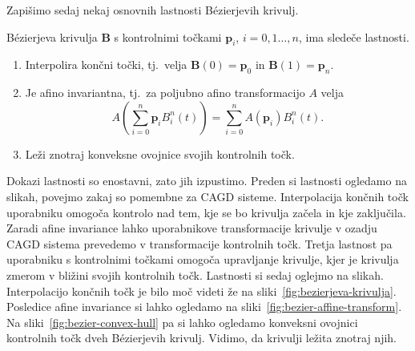 \documentclass[isrm2, tisk]{fmfdelo}
\newcommand{\p}{\mathbf{p}}
\newcommand{\lilb}[2]{B_{#1}^{#2}(t)}
\newcommand{\bernsteinsump}[2]{\sum_{#1=0}^{#2} \p_{#1}\lilb{#1}{#2}}
\newcommand{\bernsteinsumtritri}[3]{\sum_{#1=0}^{#2} #3\lilb{#1}{#2}}
\begin{document}
    Zapišimo sedaj nekaj osnovnih lastnosti Bézierjevih krivulj.
    \begin{izrek}{Bézierjeva krivulja $\mathbf{B}$ s kontrolnimi točkami $\p_i$, $i=0,1\ldots,n$, ima sledeče lastnosti.}
        \label{izrek:lastnosti-bezierjevih-krivulj}
        \begin{enumerate}
            \item Interpolira končni točki, tj.\ velja $\mathbf{B}(0)=\p_0$ in $\mathbf{B}(1)=\p_n$.
            \item Je afino invariantna, tj.\ za poljubno afino transformacijo $A$ velja \[A \left(\bernsteinsump{i}{n}\right) =\bernsteinsumtritri{i}{n}{A(\p_i)}.\]
            \item Leži znotraj konveksne ovojnice svojih kontrolnih točk.
        \end{enumerate}
    \end{izrek}
    \noindent Dokazi lastnosti so enostavni, zato jih izpustimo.
    Preden si lastnosti ogledamo na slikah, povejmo zakaj so pomembne za CAGD sisteme.
    Interpolacija končnih točk uporabniku omogoča kontrolo nad tem, kje se bo krivulja začela in kje zaključila.
    Zaradi afine invariance lahko uporabnikove transformacije krivulje v ozadju CAGD sistema prevedemo v transformacije kontrolnih točk.
    Tretja lastnost pa uporabniku s kontrolnimi točkami omogoča upravljanje krivulje, kjer je krivulja zmerom v bližini svojih kontrolnih točk.
    Lastnosti si sedaj oglejmo na slikah.
    Interpolacijo končnih točk je bilo moč videti že na sliki~\ref{fig:bezierjeva-krivulja}.
    Posledice afine invariance si lahko ogledamo na sliki~\ref{fig:bezier-affine-transform}.
    Na sliki~\ref{fig:bezier-convex-hull} pa si lahko ogledamo konveksni ovojnici kontrolnih točk dveh Bézierjevih krivulj.
    Vidimo, da krivulji ležita znotraj njih.
\end{document}

